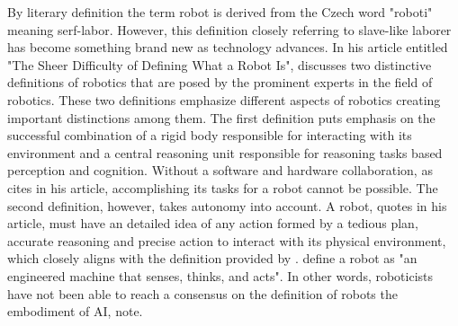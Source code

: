 \documentclass[man]{apa6}
\begin{document}
By literary definition the term robot is derived from the Czech word "roboti" meaning serf-labor. 
However, this definition closely referring to slave-like laborer has become something brand new as technology advances.
In his article entitled "The Sheer Difficulty of Defining What a Robot Is",  discusses two distinctive definitions of robotics that are posed by the prominent experts in the field of robotics.
These two definitions emphasize different aspects of robotics creating important distinctions among them.
The first definition puts emphasis on the successful combination of a rigid body responsible for interacting with its environment and a central reasoning unit responsible for reasoning tasks based perception and cognition.
Without a software and hardware collaboration, as  cites in his article, accomplishing its tasks for a robot cannot be possible.
The second definition, however, takes autonomy into account.
A robot,  quotes in his article, must have an detailed idea of any action formed by a tedious plan, accurate reasoning and precise action to interact with its physical environment, which closely aligns with the definition provided by \cite{lin}. 
\citeauthor{lin} \citeyear[p.~943]{lin} define a robot as "an engineered machine that senses, thinks, and acts".
In other words, roboticists have not been able  to reach a consensus on the definition of robots the embodiment of AI,  note.
\par
\end{document}
